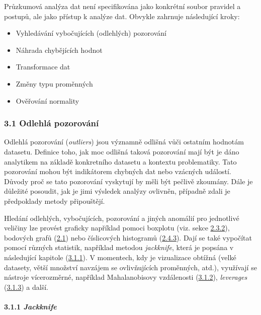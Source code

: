 \documentclass[12pt,]{article}
\providecommand{\tightlist}{%
  \setlength{\itemsep}{0pt}\setlength{\parskip}{0pt}}
\let\oldparagraph\paragraph
\renewcommand{\paragraph}[1]{\oldparagraph{#1}\mbox{}}
\begin{document}
\qquad Průzkumová analýza dat není specifikována jako konkrétní soubor
pravidel a postupů, ale jako přístup k analýze dat. Obvykle zahrnuje
následující kroky:

\begin{itemize}
\tightlist
\item
  Vyhledávání vybočujících (odlehlých) pozorování
\item
  Náhrada chybějících hodnot
\item
  Transformace dat
\item
  Změny typu proměnných
\item
  Ověřování normality
\end{itemize}

\subsubsection{3.1 Odlehlá pozorování}\label{odlehla-pozorovani}

\qquad Odlehlá pozorování (\emph{outliers}) jsou významně odlišná vůči
ostatním hodnotám datasetu. Definice toho, jak moc odlišná taková
pozorování mají být je dáno analytikem na základě konkretního datasetu a
kontextu problematiky. Tato pozorování mohou být indikátorem chybných
dat nebo vzácných událostí. Důvody proč se tato pozorování vyskytují by
měli být pečlivě zkoumány. Dále je důležité posoudit, jak je jimi
výsledek analýzy ovlivněn, případně zdali je předpoklady metody
připouštějí.

\qquad Hledání odlehlých, vybočujících, pozorování a jiných anomálií pro
jednotlivé veličiny lze provést graficky například pomoci boxplotu (viz.
sekce \protect\hyperlink{boxplot}{2.3.2}), bodových grafů
(\protect\hyperlink{scatterplot}{2.1}) nebo číslicových histogramů
(\protect\hyperlink{stem-and-leaf}{2.4.3}). Dají se také vypočítat
pomocí různých statistik, například metodou \emph{jackknife}, která je
popsána v následující kapitole (\protect\hyperlink{jackknife}{3.1.1}). V
momentech, kdy je vizualizace obtížná (velké datasety, větší množství
navzájem se ovlivňujících proměnných, atd.), využívají se nástroje
vícerozměrné, například Mahalanobisovy vzdálenosti
(\protect\hyperlink{mbdist}{3.1.2}), \emph{leverages}
(\protect\hyperlink{leverages}{3.1.3}) a další.

\hypertarget{jackknife}{\paragraph{\texorpdfstring{3.1.1
\emph{Jackknife}}{3.1.1 Jackknife}}\label{jackknife}}
\end{document}
